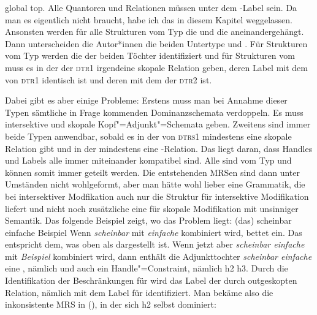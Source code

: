 global top. Alle Quantoren und Relationen müssen unter dem \gtop-Label sein. Da man es eigentlich
nicht braucht, habe ich das in diesem Kapitel weggelassen. Ansonsten werden für alle Strukturen vom
Typ  die \relswe und die \hconswe aneinandergehängt. Dann unterscheiden die Autor*innen
die beiden Untertype  und . Für Strukturen vom Typ
 werden die \ltopwe der beiden Töchter identifiziert und für Strukturen
vom  muss es in der \relsl der \textsc{dtr1} irgendeine skopale Relation geben, deren Label mit
dem \ltopw von \textsc{dtr1} identisch ist und deren \argone \qeq mit dem \ltop der \textsc{dtr2}
ist.

Dabei gibt es aber einige Probleme: Erstens muss man bei Annahme dieser Typen sämtliche
in Frage kommenden Dominanzschemata verdoppeln. Es muss intersektive und skopale
Kopf"=Adjunkt"=Schemata geben. Zweitens sind immer beide Typen anwendbar, sobald es in der \relsl
von \textsc{dtrs1} mindestens eine skopale Relation gibt und in der \hconsl mindestens eine
\qeq-Relation. Das liegt daran, dass Handles und Labels alle immer miteinander kompatibel sind. Alle
sind vom Typ  und können somit immer geteilt werden. Die
entstehenden MRSen sind dann unter Umständen nicht wohlgeformt, aber man hätte wohl lieber eine
Grammatik, die bei intersektiver Modfikation auch nur die Struktur für intersektive Modifikation
liefert und nicht noch zusätzliche eine für skopale Modifikation mit unsinniger Semantik. Das
folgende Beispiel zeigt, wo das Problem liegt:
\eal
\ex (das) scheinbar einfache Beispiel
\ex {}
\zl
Wenn \emph{scheinbar} mit \emph{einfache} kombiniert wird, bettet 
 ein. Das entspricht dem, was oben als  dargestellt ist. Wenn
jetzt aber \emph{scheinbar einfache} mit \emph{Beispiel} kombiniert wird, dann enthält die
Adjunkttochter \emph{scheinbar einfache} eine , nämlich  und
auch ein Handle"=Constraint, nämlich h2 \qeq h3. Durch die Identifikation der Beschränkungen für
 wird das Label der durch  outgeskopten Relation, nämlich
 mit dem Label für  identifiziert. Man bekäme also die
inkonsistente MRS in (), in der sich h2 selbst dominiert:
\ea
{}
